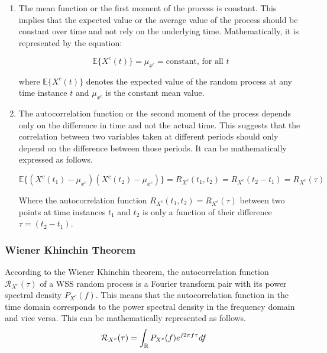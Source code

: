 \begin{enumerate}
    \item The mean function or the first moment of the process is constant. This implies that the expected value or the average value of the process should be constant over time and not rely on the underlying time. Mathematically, it is represented by the equation:

    \begin{equation}
        \mathbb{E}\{X^{c}(t)\} = \mu_{x^{c}} = \text{constant, for all } t
    \end{equation}

    where $\mathbb{E}\{X^{c}(t)\}$ denotes the expected value of the random process at any time instance $t$ and $\mu_{x^{c}}$ is the constant mean value.

    \item The autocorrelation function or the second moment of the process depends only on the difference in time and not the actual time. This suggests that the correlation between two variables taken at different periods should only depend on the difference between those periods. It can be mathematically expressed as follows.

    \begin{equation}
        \mathbb{E}\{(X^{c}(t_1)-\mu_{x^{c}})(X^{c}(t_2)-\mu_{x^{c}})\} = R_{X^{c}}(t_1,t_2) = R_{X^{c}}(t_2-t_1) = R_{X^{c}}(\tau)
    \end{equation}
    
    Where the autocorrelation function $R_{X^{c}}(t_1,t_2) = R_{X^{c}}(\tau)$ between two points at time instances $t_1$ and $t_2$ is only a function of their difference $\tau=(t_2 - t_1)$. 
\end{enumerate}

\subsubsection{Wiener Khinchin Theorem}

According to the Wiener Khinchin theorem, the autocorrelation function $\mathcal{R}_{X^c}(\tau)$ of a WSS random process is a Fourier transform pair with its power spectral density $P_{X^c}(f)$. This means that the autocorrelation function in the time domain corresponds to the power spectral density in the frequency domain and vice versa. This can be mathematically represented as follows.
\begin{equation}
    \mathcal{R}_{X^c}(\tau) = \int_{\mathbb{R}} P_{X^c}(f) e^{j 2\pi f \tau} df
\end{equation}

